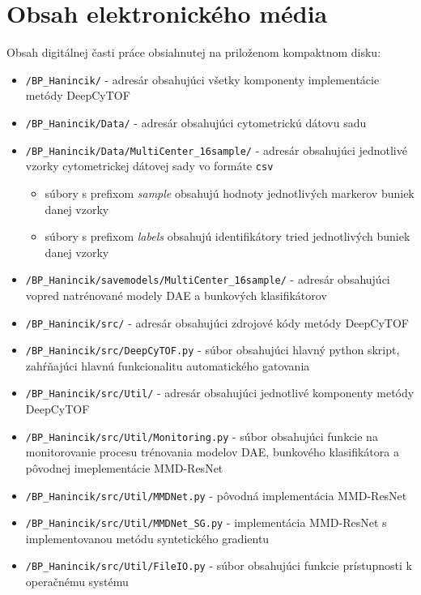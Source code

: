 \chapter{Obsah elektronického média}

Obsah digitálnej časti práce obsiahnutej na priloženom kompaktnom disku:
\begin{itemize}
    \item \texttt{/BP_Hanincik/} - adresár obsahujúci všetky komponenty implementácie metódy DeepCyTOF
    \item \texttt{/BP_Hanincik/Data/} - adresár obsahujúci cytometrickú dátovu sadu
    \item \texttt{/BP_Hanincik/Data/MultiCenter_16sample/} - adresár obsahujúci jednotlivé vzorky cytometrickej dátovej sady vo formáte \texttt{csv}
    \begin{itemize}
        \item súbory s prefixom \textit{sample} obsahujú hodnoty jednotlivých markerov buniek danej vzorky
        \item súbory s prefixom \textit{labels} obsahujú identifikátory tried jednotlivých buniek danej vzorky
    \end{itemize}
    \item \texttt{/BP_Hanincik/savemodels/MultiCenter_16sample/} - adresár obsahujúci vopred natrénované modely DAE a bunkových klasifikátorov
    \item \texttt{/BP_Hanincik/src/} - adresár obsahujúci zdrojové kódy metódy DeepCyTOF
    \item \texttt{/BP_Hanincik/src/DeepCyTOF.py} - súbor obsahujúci hlavný python skript, zahŕňajúci hlavnú funkcionalitu automatického gatovania
    \item \texttt{/BP_Hanincik/src/Util/} - adresár obsahujúci jednotlivé komponenty metódy DeepCyTOF
    \item \texttt{/BP_Hanincik/src/Util/Monitoring.py} - súbor obsahujúci funkcie na monitorovanie procesu trénovania modelov DAE, bunkového klasifikátora a pôvodnej imeplementácie MMD-ResNet
    \item \texttt{/BP_Hanincik/src/Util/MMDNet.py} - pôvodná implementácia MMD-ResNet
    \item \texttt{/BP_Hanincik/src/Util/MMDNet_SG.py} - implementácia MMD-ResNet s implementovanou metódu syntetického gradientu
    \item \texttt{/BP_Hanincik/src/Util/FileIO.py} - súbor obsahujúci funkcie prístupnosti k operačnému systému

\end{itemize}
